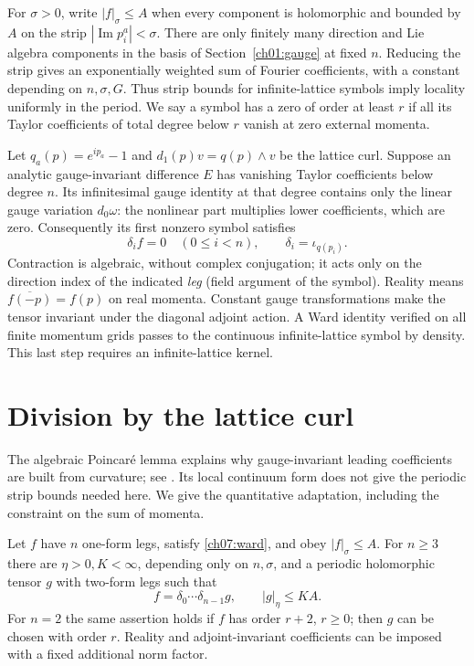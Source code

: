 For $\sigma>0$, write $|f|_\sigma\le A$ when every component is
holomorphic and bounded by $A$ on the strip
$|\operatorname{Im}p_i^a|<\sigma$. There are only finitely many direction
and Lie algebra components in the basis of Section~\ref{ch01:gauge} at fixed $n$. Reducing the strip gives an
exponentially weighted sum of Fourier coefficients, with a constant
depending on $n,\sigma,G$. Thus strip bounds for infinite-lattice symbols imply locality
uniformly in the period. We say a symbol has a zero of order at least $r$
if all its Taylor coefficients of total degree below $r$ vanish at zero
external momenta.

Let $q_a(p)=e^{ip_a}-1$ and $d_1(p)v=q(p)\wedge v$ be the lattice
curl. Suppose an analytic gauge-invariant difference $E$ has vanishing
Taylor coefficients below degree $n$. Its infinitesimal gauge identity
at that degree contains only the linear gauge variation $d_0\omega$:
the nonlinear part multiplies lower coefficients, which are zero.
Consequently its first nonzero symbol satisfies
\begin{equation}\label{ch07:ward}
 \delta_i f=0\quad(0\le i<n),\qquad
 \delta_i=\iota_{q(p_i)}.
\end{equation}
Contraction is algebraic, without complex conjugation; it acts only on
the direction index of the indicated \emph{leg} (field argument of the symbol). Reality means
$\overline{f(-p)}=f(p)$ on real momenta. Constant gauge transformations
make the tensor invariant under the diagonal adjoint action. A Ward identity verified on
all finite momentum grids passes to the continuous infinite-lattice symbol by
density. This last step requires an infinite-lattice kernel.

\section{Division by the lattice curl}\label{ch07:division}

The algebraic Poincar\'e lemma explains why gauge-invariant leading
coefficients are built from curvature; see
\cite[Section~4]{BarnichBrandtHenneaux2000}. Its local continuum form does
not give the periodic strip bounds needed here. We give the quantitative
adaptation, including the constraint on the sum of momenta.

\begin{lemma}\label{ch07:curl}
Let $f$ have $n$ one-form legs, satisfy \eqref{ch07:ward}, and obey
$|f|_\sigma\le A$. For $n\ge3$ there are $\eta>0,K<\infty$,
depending only on $n,\sigma$, and a periodic holomorphic tensor $g$
with two-form legs such that
\[
 f=\delta_0\cdots\delta_{n-1}g,\qquad |g|_\eta\le KA.
\]
For $n=2$ the same assertion holds if $f$ has order $r+2$, $r\ge0$;
then $g$ can be chosen with order $r$. Reality and adjoint-invariant
coefficients can be imposed with a fixed additional norm factor.
\end{lemma}

